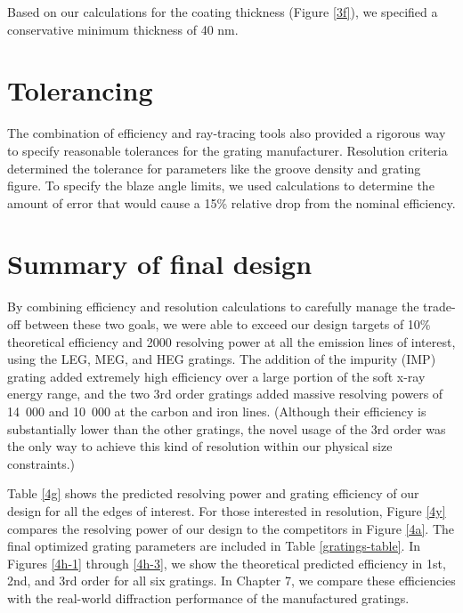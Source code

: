 Based on our calculations for the coating thickness (Figure \ref{3f}), we specified a conservative minimum thickness of 40 nm.

\section{Tolerancing}
The combination of efficiency and ray-tracing tools also provided a rigorous way to specify reasonable tolerances for the grating manufacturer.  Resolution criteria determined the tolerance for parameters like the groove density and grating figure.  To specify the blaze angle limits, we used calculations to determine the amount of error that would cause a 15\% relative drop from the nominal efficiency.

\section{Summary of final design}
By combining efficiency and resolution calculations to carefully manage the trade-off between these two goals, we were able to exceed our design targets of 10\% theoretical efficiency and 2000 resolving power at all the emission lines of interest, using the LEG, MEG, and HEG gratings.  The addition of the impurity (IMP) grating added extremely high efficiency over a large portion of the soft x-ray energy range, and the two 3rd order gratings added massive resolving powers of 14~000 and 10~000 at the carbon and iron lines.  (Although their efficiency is substantially lower than the other gratings, the novel usage of the 3rd order was the only way to achieve this kind of resolution within our physical size constraints.)

Table \ref{4g} shows the predicted resolving power and grating efficiency of our design for all the edges of interest.  For those interested in resolution, Figure \ref{4y} compares the resolving power of our design to the competitors in Figure \ref{4a}.  The final optimized grating parameters are included in Table \ref{gratings-table}.  In Figures \ref{4h-1} through \ref{4h-3}, we show the theoretical predicted efficiency in 1st, 2nd, and 3rd order for all six gratings.  In Chapter 7, we compare these efficiencies with the real-world diffraction performance of the manufactured gratings.

